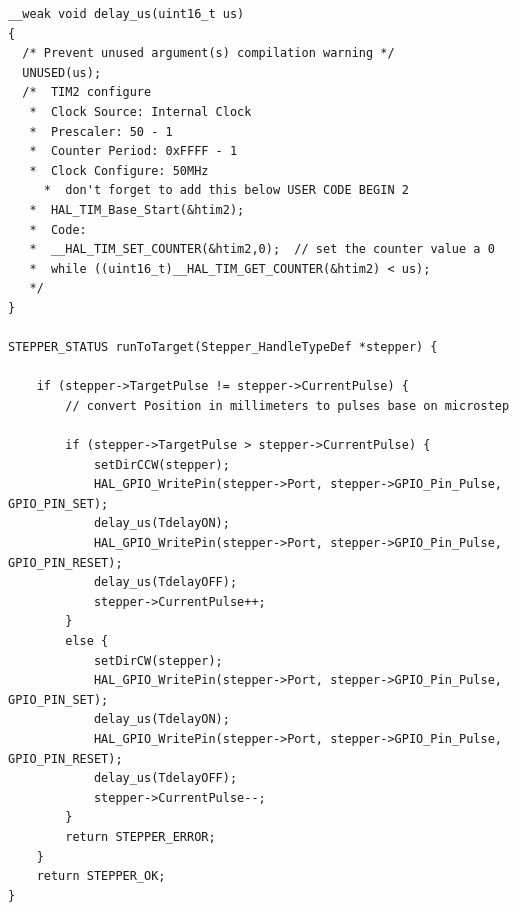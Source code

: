 \begin{lstlisting}
__weak void delay_us(uint16_t us)
{
  /* Prevent unused argument(s) compilation warning */
  UNUSED(us);
  /*  TIM2 configure
   *  Clock Source: Internal Clock
   *  Prescaler: 50 - 1
   *  Counter Period: 0xFFFF - 1
   *  Clock Configure: 50MHz
     *  don't forget to add this below USER CODE BEGIN 2
   *  HAL_TIM_Base_Start(&htim2);
   *  Code:
   *  __HAL_TIM_SET_COUNTER(&htim2,0);  // set the counter value a 0
   *  while ((uint16_t)__HAL_TIM_GET_COUNTER(&htim2) < us);
   */
}

STEPPER_STATUS runToTarget(Stepper_HandleTypeDef *stepper) {

    if (stepper->TargetPulse != stepper->CurrentPulse) {
        // convert Position in millimeters to pulses base on microstep
        
        if (stepper->TargetPulse > stepper->CurrentPulse) {
            setDirCCW(stepper);
            HAL_GPIO_WritePin(stepper->Port, stepper->GPIO_Pin_Pulse, GPIO_PIN_SET);
            delay_us(TdelayON);
            HAL_GPIO_WritePin(stepper->Port, stepper->GPIO_Pin_Pulse, GPIO_PIN_RESET);
            delay_us(TdelayOFF);
            stepper->CurrentPulse++;
        }
        else {
            setDirCW(stepper);
            HAL_GPIO_WritePin(stepper->Port, stepper->GPIO_Pin_Pulse, GPIO_PIN_SET);
            delay_us(TdelayON);
            HAL_GPIO_WritePin(stepper->Port, stepper->GPIO_Pin_Pulse, GPIO_PIN_RESET);
            delay_us(TdelayOFF);
            stepper->CurrentPulse--;
        }
        return STEPPER_ERROR;
    }
    return STEPPER_OK;
}
\end{lstlisting}

